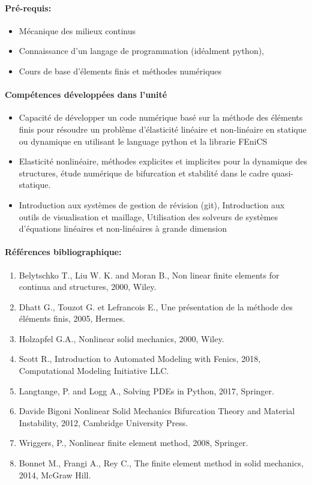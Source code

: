 \paragraph{Pré-requis:}
\begin{itemize}
\item Mécanique des milieux continus
\item Connaissance d’un langage de programmation (idéalment python),
\item Cours de base d’élements finis et méthodes numériques
\end{itemize}


\paragraph{Compétences développées dans l’unité}
\begin{itemize}
\item Capacité de développer un code numérique basé sur la méthode des éléments finis pour résoudre un problème d’élasticité linéaire et non-linéaire en statique ou dynamique en utilisant le language python et la librarie FEniCS
\item Elasticité nonlinéaire,  méthodes explicites et implicites pour la dynamique des structures, étude numérique de bifurcation et stabilité dans le cadre quasi-statique.
\item Introduction aux systèmes de gestion de révision (git), Introduction aux outils de visualisation et maillage, Utilisation des solveurs de systèmes d’équations linéaires et non-linéaires à grande dimension
\end{itemize}

\paragraph{Références bibliographique:}
{\footnotesize
\begin{enumerate}
	\item Belytschko T., Liu W. K. and Moran B., Non linear finite elements for continua and structures, 2000, Wiley. 
 \item Dhatt G., Touzot G. et Lefrancois E., Une présentation de la méthode des éléments finis, 2005, Hermes.
 \item  Holzapfel G.A., Nonlinear solid mechanics, 2000, Wiley.
 \item Scott R., Introduction to Automated Modeling with Fenics, 2018, Computational Modeling Initiative LLC.
 \item Langtange, P. and Logg A., Solving PDEs in Python, 2017, Springer.
 \item Davide Bigoni 
  Nonlinear Solid Mechanics
  Bifurcation Theory and Material Instability, 2012, 
   Cambridge University Press.
 \item Wriggers, P., Nonlinear finite element method, 2008, Springer.
 \item Bonnet M., Frangi A., Rey C., The finite element method in solid mechanics, 2014, McGraw Hill.
\end{enumerate}
}
